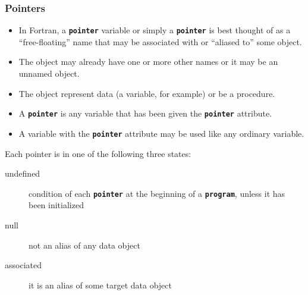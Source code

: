 \documentclass[slidestop,mathserif,compress,xcolor=svgnames]{beamer}
\newcommand{\bftt}[1]{\textbf{\texttt{#1}}}
\begin{document}
\begin{frame}[allowframebreaks]
  \frametitle{\small Pointers}
  \begin{itemize}
    \item In Fortran, a \bftt{pointer} variable or simply a \bftt{pointer} is best thought of as a ``free-floating'' name that may be associated with or ``aliased to'' some object.
    \item The object may already have one or more other names or it may be an unnamed object.
    \item The object represent data (a variable, for example) or be a procedure.
    \item A \bftt{pointer} is any variable that has been given the \bftt{pointer} attribute.
    \item A variable with the \bftt{pointer} attribute may be used like any ordinary variable.
  \end{itemize}

  \begin{block}{}
    Each pointer is in one of the following three states:
    \begin{description}
      \item[undefined] condition of each \bftt{pointer} at the beginning of a \bftt{program}, unless it has been initialized
      \item[null] not an alias of any data object
      \item[associated] it is an alias of some target data object
    \end{description}
  \end{block}
  

\end{frame}
\end{document}
